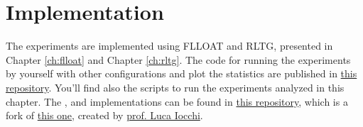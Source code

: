 \section{Implementation}
The experiments are implemented using FLLOAT and RLTG, presented in Chapter \ref{ch:flloat} and Chapter \ref{ch:rltg}.
The code for running the experiments by yourself with other configurations and plot the statistics are published in \href{https://github.com/MarcoFavorito/rltg-examples}{this repository}. You'll find also the scripts to run the experiments analyzed in this chapter. The \Breakout, \Sapientino and \Minecraft implementations can be found in \href{https://github.com/MarcoFavorito/RLgames}{this repository}, which is a fork of \href{https://github.com/iocchi/RLgames}{this one}, created by \href{https://sites.google.com/a/dis.uniroma1.it/iocchi/home}{prof. Luca Iocchi}.